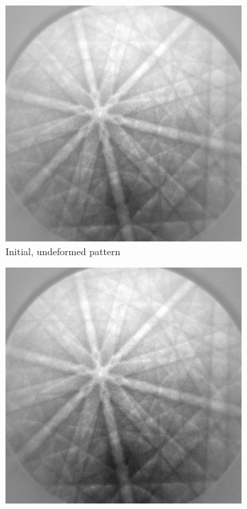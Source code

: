 \begin{figure}
	
	\begin{subfigure}{.4\textwidth}
		\centering
		\includegraphics[width=.9\linewidth]{img/roi_shifts_initial}
		\caption{Initial, undeformed pattern}
		\label{roi-shifts:initial}
	\end{subfigure}%
	\begin{subfigure}{.4\textwidth}
		\centering
		\includegraphics[width=.9\linewidth]{img/DEFORMED_x3600y6235}

\end{subfigure}
\end{figure}
